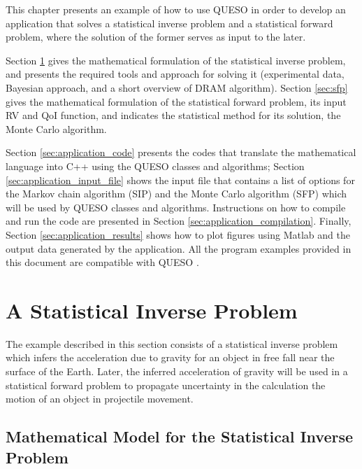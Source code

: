 This chapter presents an example of how to use QUESO in order to develop an application that solves a statistical inverse problem and
a statistical forward problem, where the solution of the former serves as input to the later.


Section \ref{sec:sip} gives the mathematical formulation of the statistical inverse problem, and presents the required tools and approach for solving it (experimental data, Bayesian approach, and a short overview of DRAM algorithm). Section \ref{sec:sfp} gives the mathematical formulation of the statistical forward problem, its input RV and QoI function, and indicates the statistical method for its solution, the Monte Carlo algorithm.


Section \ref{sec:application_code} presents the codes that translate the mathematical language into C++ using the QUESO classes and algorithms; Section \ref{sec:application_input_file} shows the input file that contains  a list of options for the Markov chain algorithm  (SIP) and the Monte Carlo
algorithm (SFP) which will be used by QUESO classes and algorithms. Instructions on how to compile and run the code are presented in Section \ref{sec:application_compilation}.  Finally, Section \ref{sec:application_results} shows how to plot figures using Matlab and the output data generated by the application.
All the program examples provided in this document are compatible with QUESO \QUESOversion{}. 

\section{A Statistical Inverse Problem}\label{sec:sip}
% 


The example described in this section consists of a statistical inverse problem which infers the  acceleration due to gravity for an object in free fall near the surface of the Earth. Later, the inferred acceleration of gravity will be used in a statistical forward problem to propagate uncertainty in the calculation the motion of an object in projectile movement.


\subsection{Mathematical Model for the Statistical Inverse Problem}


